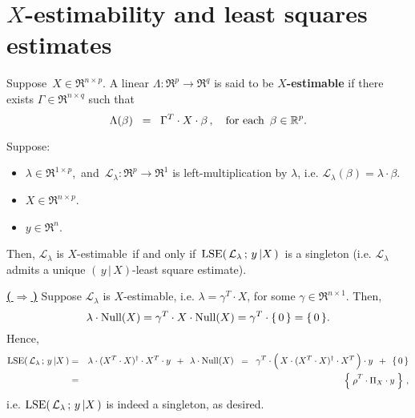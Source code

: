 

\section{$X$-estimability and least squares estimates}
\setcounter{theorem}{0}
\setcounter{equation}{0}

\renewcommand{\theenumi}{\roman{enumi}}
\renewcommand{\labelenumi}{\textnormal{(\theenumi)}$\;\;$}


\begin{definition}
\mbox{}\vskip 0.1cm\noindent
Suppose \,$X \in \Re^{n \times p}$.
A linear $\Lambda : \Re^{p} \longrightarrow \Re^{q}$ is said to be \textbf{$X$-estimable}
if there exists $\Gamma \in \Re^{n \times q}$ such that
\begin{equation*}
\Lambda(\beta) \;\; =\;\; \Gamma^{T} \cdot X \cdot \beta\,,
\quad
\textnormal{for each \,$\beta \in \Re^{p}$}.
\end{equation*}
\end{definition}

\begin{proposition}
\label{VectorEstimabilityImpliesUniqueLSE}
\mbox{}\vskip 0.1cm\noindent
Suppose:
\begin{itemize}
\item
	$\lambda \in \Re^{1 \times p}$,\,
	and
	\,$\mathcal{L}_{\lambda} : \Re^{p} \longrightarrow \Re^{1}$ is left-multiplication by $\lambda$,
	i.e. $\mathcal{L}_{\lambda}(\beta) = \lambda \cdot \beta$.
\item
	$X \in \Re^{n \times p}$.
\item
	$y \in \Re^{n}$.
\end{itemize}
Then,
	$\mathcal{L}_{\lambda}$ is $X$-estimable
	\,if and only if\,
	$\lse\!\left(\,\mathcal{L}_{\lambda} \,;\, y\,\vert X\,\right)$\,
	is a singleton (i.e. $\mathcal{L}_{\lambda}$ admits a unique $(\,y\,\vert\,X)$-least square estimate).
\end{proposition}
\proof
\vskip 0.2cm\noindent
\underline{\textbf{(\,$\Longrightarrow$\,)}}\quad
Suppose $\mathcal{L}_{\lambda}$ is $X$-estimable, i.e. $\lambda = \gamma^{T} \cdot X$,
for some $\gamma \in \Re^{n \times 1}$.
Then,
\begin{equation*}
\lambda\cdot\Null(X) = \gamma^{T} \cdot X \cdot \Null(X) = \gamma^{T} \cdot \{\,0\,\} = \{\,0\,\}.
\end{equation*}
Hence,
\begin{eqnarray*}
\lse\!\left(\,\mathcal{L}_{\lambda} \,;\, y\,\vert X\,\right)
&=&
	\lambda \cdot (X^{T} \cdot X)^{\dagger} \cdot X^{T} \cdot y \;\, + \;\, \lambda \cdot \Null(X)
\;\;=\;\;
	\gamma^{T} \cdot \left(\,\overset{{\color{white}.}}{X} \cdot (X^{T} \cdot X)^{\dagger} \cdot X^{T}\,\right) \cdot y \;\, + \;\, \{\,0\,\}
\\
&=&
	\left\{\; \overset{{\color{white}.}}{\rho}^{T} \cdot \Pi_{X} \cdot y \;\right\}\,,
\end{eqnarray*}
i.e. $\lse\!\left(\,\mathcal{L}_{\lambda} \,;\, y\,\vert X\,\right)$ is indeed a singleton, as desired.

